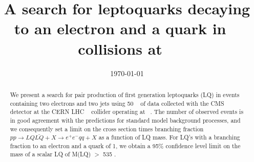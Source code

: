 \documentclass[prl,showpcs,amsmath,amssymb,twocolumn]{revtex4}
\begin{document}



\title{                                                                          
A search for leptoquarks decaying to an electron and a quark                     
in \pp~ collisions at ~\tev                                           
}
\date{\today}

\begin{abstract}
We present a search for pair production of first generation leptoquarks (LQ)
in events containing two electrons and
two jets using 50 \ipb~ of data collected with
the CMS detector at the CERN LHC \pp~ collider operating at ~\tev.
The number of observed events is in good agreement with
the predictions for standard model background processes,
and we consequently
set a limit on the cross section times branching fraction
$pp \rightarrow LQ\bar{LQ}+X \rightarrow e^+e^-qq+X$
 as a function of LQ mass. For LQ's with a branching fraction to
an electron and a quark of 1,
we obtain a 95\% confidence level limit on the mass of a scalar
LQ of M(LQ) $>$ 535 \gev.
\end{abstract}

\maketitle


\end{document}
